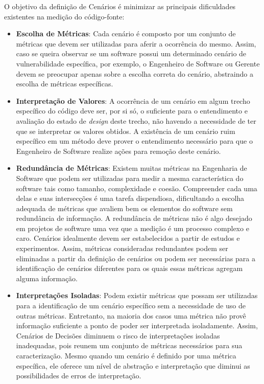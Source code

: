 O objetivo da definição de Cenários é minimizar as principais dificuldades existentes na medição do código-fonte:

\begin{itemize}
\item \textbf{Escolha de Métricas}: Cada cenário é composto por um conjunto de métricas que devem ser utilizadas para aferir a ocorrência do mesmo. Assim, caso se queira observar se um software possui um determinado cenário de vulnerabilidade específica, por exemplo, o Engenheiro de Software ou Gerente devem se preocupar apenas sobre a escolha correta do cenário, abstraindo a escolha de métricas específicas.

\item \textbf{Interpretação de Valores}: A ocorrência de um cenário em algum trecho específico do código deve ser, por si só, o suficiente para o entendimento e avaliação do estado de \emph{design} deste trecho, não havendo a necessidade de ter que se interpretar os valores obtidos. A existência de um cenário ruim específico em um  método deve prover o entendimento necessário para que o Engenheiro de Software realize ações para remoção deste cenário.

\item \textbf{Redundância de Métricas}: Existem muitas métricas na Engenharia de Software que podem ser utilizadas para medir a mesma característica do software tais como tamanho, complexidade e coesão. Compreender cada uma delas e suas intersecções é uma tarefa dispendiosa, dificultando a escolha adequada de métricas que avaliem bem os elementos do software sem redundância de informação. A redundância de métricas não é algo desejado em projetos de software uma vez que a medição é um processo complexo e caro. Cenários idealmente devem ser estabelecidos a partir de estudos e experimentos. Assim, métricas consideradas redundantes podem ser eliminadas a partir da definição de cenários ou podem ser necessárias para a identificação de cenários diferentes para os quais essas métricas agregam alguma informação.

\item \textbf{Interpretações Isoladas}: Podem existir métricas que possam ser utilizadas para a identificação de um cenário específico sem a necessidade de uso de outras métricas. Entretanto, na maioria dos casos uma métrica não provê informação suficiente a ponto de poder ser interpretada isoladamente. Assim, Cenários de Decisões diminuem o risco de interpretações isoladas inadequadas, pois reunem um conjunto de métricas necessários para sua caracterização. Mesmo quando um cenário é definido por uma métrica específica, ele oferece um nível de abstração e interpretação que diminui as possibilidades de erros de interpretação.


\end{itemize}
